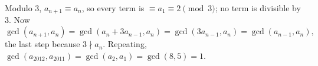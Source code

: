 Modulo $3$, $a_{n+1}\equiv a_n$, so every term is $\equiv a_1\equiv2\pmod3$; no term is divisible by $3$. Now
\[\gcd(a_{n+1},a_n)=\gcd(a_n+3a_{n-1},a_n)=\gcd(3a_{n-1},a_n)=\gcd(a_{n-1},a_n),\]
the last step because $3\nmid a_n$. Repeating, $\gcd(a_{2012},a_{2011})=\gcd(a_2,a_1)=\gcd(8,5)=\boxed{1}$.

